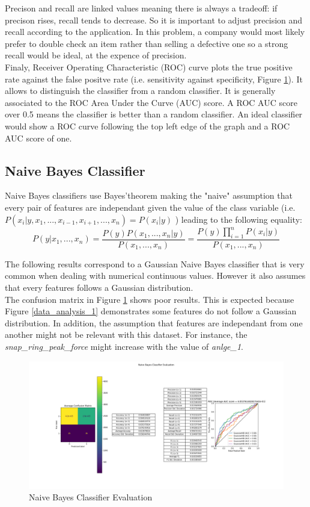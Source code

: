 Precison and recall are linked values meaning there is always a tradeoff: if
precison rises, recall tends to decrease. So it is important to adjust
precision and recall according to the application. In this problem, a company
would most likely prefer to double check an item rather than selling a
defective one so a strong recall would be ideal, at the expence of precision.\\

Finaly, Receiver Operating Characteristic (ROC) curve plots the true positive
rate against the false positve rate (i.e. sensitivity against specificity,
Figure \ref{nbc}). It allows to distinguish the classifier from a random
classifier. It is generally associated to the ROC Area Under the Curve (AUC)
score. A ROC AUC score over 0.5 means the classifier is better than a random
classifier. An ideal classifier would show a ROC curve following the top left
edge of the graph and a ROC AUC score of one.\\

\subsection{Naive Bayes Classifier}
Naive Bayes classifiers use Bayes'theorem making the "naive" assumption that
every pair of features are independant given the value of the class variable
\cite{nbc_scikit} (i.e. \(P(x_i | y, x_1,..., x_{i-1}, x_{i+1},..., x_n) =
P(x_i | y)\) ) leading to the following equality:
\[ P(y | x_1,..., x_n) = \frac{P(y)P(x_1,..., x_n | y)}{P(x_1,..., x_n)} =
    \frac{P(y)\prod_{i=1}^n P(x_i | y)}{P(x_1,..., x_n)} \]

The following results correspond to a Gaussian Naive Bayes \cite{nbcg_scikit}
classifier that is very common when dealing with numerical continuous values.
However it also assumes that every features follows a Gaussian distribution.\\

The confusion matrix in Figure \ref{nbc} shows poor results. This is expected
because Figure \ref{data_analysis_1} demonstrates some features do not follow a
Gaussian distribution. In addition, the assumption that features are
independant from one another might not be relevant with this dataset. For
instance, the \textit{snap\_ring\_peak\_force} might increase with the value of
\textit{anlge\_1}.

\begin{figure}
    \center
    \includegraphics[scale=0.32]{img/nbc_d.png}
    \caption{Naive Bayes Classifier Evaluation}
    \label{nbc}
\end{figure}

